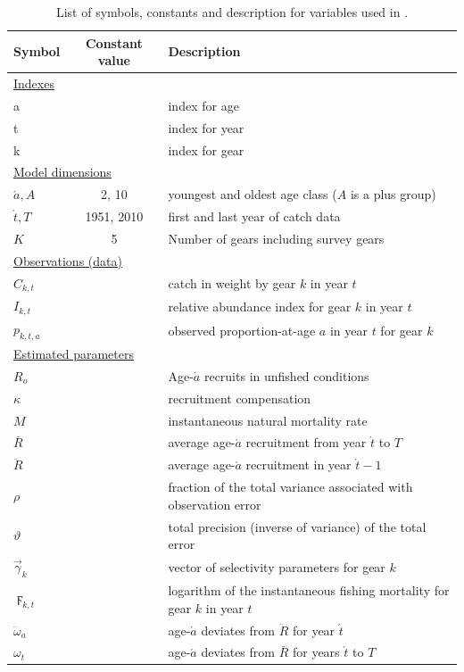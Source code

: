 \begin{table}[htdp]
\caption{List of symbols, constants and description for variables used in \iscam.}\label{TableSymbols}
\begin{center}
\begin{tabular}{lcl}
\hline
Symbol & Constant value & Description\\
\hline
\multicolumn{3}{l}{\underline{Indexes}}\\
a & & index for age\\
t & & index for year\\
k & & index for gear\\
\multicolumn{3}{l}{\underline{Model dimensions}}\\
$\acute{a}, A$ & 2, 10& youngest and oldest age class ($A$ is a plus group)\\
$\acute{t}, T$ & 1951, 2010 & first and last year of catch data\\
$K$ & 5 & Number of gears including survey gears\\
\multicolumn{3}{l}{\underline{Observations (data)}}\\
$C_{k,t}$ & & catch in weight by gear $k$ in year $t$\\
$I_{k,t}$ & & relative abundance index for gear $k$ in year $t$\\
$p_{k,t,a}$& & observed proportion-at-age $a$ in year $t$ for gear $k$\\
\multicolumn{3}{l}{\underline{Estimated parameters}}\\
$R_o$ & & Age-$\acute{a}$ recruits in unfished conditions\\
$\kappa$ & & recruitment compensation\\
$M$ & & instantaneous natural mortality rate \\
$\bar{R}$ & & average age-$\acute{a}$ recruitment from year $\acute{t}$ to $T$\\
$\ddot{R}$ & & average age-$\acute{a}$ recruitment in year $\acute{t}-1$\\
$\rho$ & & fraction of the total variance associated with observation error\\
$\vartheta$ & & total precision (inverse of variance) of the total error\\
$\vec{\gamma}_k$ & & vector of selectivity parameters for gear $k$\\
$\digamma_{k,t}$ & & logarithm of the instantaneous fishing mortality for gear $k$ in year $t$\\
$\ddot{\omega}_a$&& age-$\acute{a}$ deviates from $\ddot{R}$ for year $\acute{t}$\\
$\omega_t$&& age-$\acute{a}$ deviates from $\bar{R}$ for years $\acute{t}$ to $T$\\
\hline \hline
\end{tabular}
\end{center}
\end{table}%


